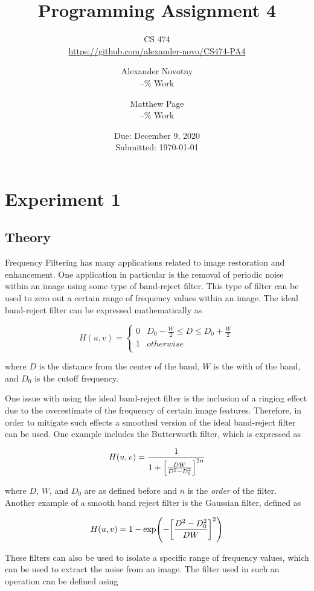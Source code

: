 \documentclass[headings=optiontoheadandtoc,listof=totoc,parskip=full]{scrartcl}
\title{Programming Assignment 4}
\subtitle{CS 474\\\url{https://github.com/alexander-novo/CS474-PA4}}
\author{Alexander Novotny\\--\% Work\\ \and Matthew Page\\--\% Work\\}
\date{Due: December 9, 2020 \\ Submitted: \today}
\begin{document}
\maketitle
\tableofcontents
{}

\newpage
{}

\section{Experiment 1}
\label{sec:exp-1}

\subsection{Theory}

Frequency Filtering has many applications related to image restoration and enhancement. One application in particular is the removal of periodic noise within an image using some type of band-reject filter. This type of filter can be used to zero out a certain range of frequency values within an image. The ideal band-reject filter can be expressed mathematically as

\[
	H(u,v) = 	\begin{cases} 
      				0 & D_0-\frac{W}{2} \leq D \leq D_0+\frac{W}{2} \\
      				1 & otherwise \\
   				\end{cases}
\]

where $D$ is the distance from the center of the band, $W$ is the with of the band, and $D_0$ is the cutoff frequency.

One issue with using the ideal band-reject filter is the inclusion of a ringing effect due to the overestimate of the frequency of certain image features. Therefore, in order to mitigate such effects a smoothed version of the ideal band-reject filter can be used. One example includes the Butterworth filter, which is expressed as 

\[
	H(u,v) = \frac{1}{1+\qty[\frac{DW}{D^2-D_0^2}]^{2n}}
\]

where $D$, $W$, and $D_0$ are as defined before and $n$ is the \emph{order} of the filter. Another example of a smooth band reject filter is the Gaussian filter, defined as

\[
	H(u,v) = 1-\exp(-\qty[\frac{D^2-D_0^2}{DW}]^2)
\]

These filters can also be used to isolate a specific range of frequency values, which can be used to extract the noise from an image. The filter used in such an operation can be defined using
\end{document}
